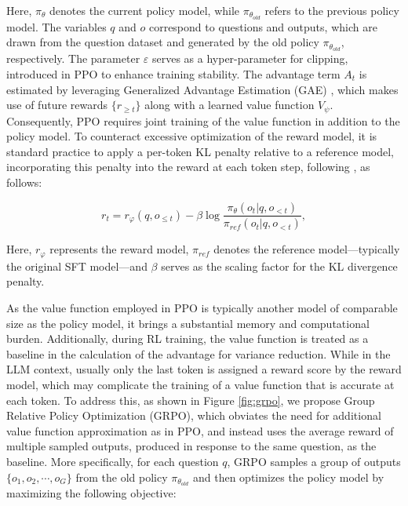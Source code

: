 \begin{itemize}[topsep=0pt]
\begin{itemize}[topsep=0pt]
Here, $\pi_{\theta}$ denotes the current policy model, while $\pi_{\theta_{old}}$ refers to the previous policy model. The variables $q$ and $o$ correspond to questions and outputs, which are drawn from the question dataset and generated by the old policy $\pi_{\theta_{old}}$, respectively. The parameter $\varepsilon$ serves as a hyper-parameter for clipping, introduced in PPO to enhance training stability. The advantage term $A_t$ is estimated by leveraging Generalized Advantage Estimation (GAE) \citep{gae}, which makes use of future rewards $\{r_{\ge t}\}$ along with a learned value function $V_{\psi}$. Consequently, PPO requires joint training of the value function in addition to the policy model. To counteract excessive optimization of the reward model, it is standard practice to apply a per-token KL penalty relative to a reference model, incorporating this penalty into the reward at each token step, following \citep{ouyang2022training}, as follows:

\begin{equation}
    r_{t} = r_\varphi(q, o_{\le t}) - \beta \log\frac{\pi_{\theta}(o_{t}|q, o_{<t})}{\pi_{ref}(o_{t}|q, o_{<t})},
\label{eq:PPO-reward}
\end{equation}

Here, $r_\varphi$ represents the reward model, $\pi_{ref}$ denotes the reference model—typically the original SFT model—and $\beta$ serves as the scaling factor for the KL divergence penalty.

As the value function employed in PPO is typically another model of comparable size as the policy model, it brings a substantial memory and computational burden. Additionally, during RL training, the value function is treated as a baseline in the calculation of the advantage for variance reduction. While in the LLM context, usually only the last token is assigned a reward score by the reward model, which may complicate the training of a value function that is accurate at each token. To address this, as shown in Figure \ref{fig:grpo}, we propose Group Relative Policy Optimization (GRPO), which obviates the need for additional value function approximation as in PPO, and instead uses the average reward of multiple sampled outputs, produced in response to the same question, as the baseline. More specifically, for each question $q$, GRPO samples a group of outputs $\{o_1, o_2, \cdots, o_G\}$  from the old policy  $\pi_{\theta_{old}}$  and then optimizes the policy model by maximizing the following objective:


\end{itemize}
\end{itemize}
